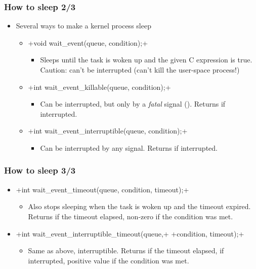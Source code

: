 \begin{frame}[fragile]
  \frametitle{How to sleep 2/3}
  \begin{itemize}
  \item Several ways to make a kernel process sleep
    \begin{itemize}
    \item {}+void wait_event(queue, condition);+
      \begin{itemize}
      \item Sleeps until the task is woken up and the given C
        expression is true. Caution: can't be interrupted (can't kill
        the user-space process!)
      \end{itemize}
    \item {}+int wait_event_killable(queue, condition);+
      \begin{itemize}
      \item Can be interrupted, but only by a \emph{fatal} signal
        (). Returns  if interrupted.
      \end{itemize}
    \item {}+int wait_event_interruptible(queue, condition);+
      \begin{itemize}
      \item Can be interrupted by any signal. Returns
         if interrupted.
      \end{itemize}
    \end{itemize}
  \end{itemize}
\end{frame}

\begin{frame}[fragile]
  \frametitle{How to sleep 3/3}
  \begin{itemize}
  \item {}+int wait_event_timeout(queue, condition, timeout);+
    \begin{itemize}
    \item Also stops sleeping when the task is woken up and the
      timeout expired. Returns  if the timeout elapsed, non-zero if
      the condition was met.
    \end{itemize}
  \item {}+int wait_event_interruptible_timeout(queue,+
    +condition, timeout);+
    \begin{itemize}
    \item Same as above, interruptible. Returns  if the timeout
      elapsed,  if interrupted, positive value if
      the condition was met.
    \end{itemize}
  \end{itemize}
\end{frame}


